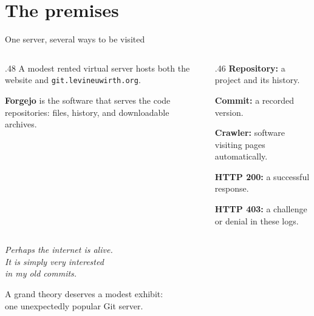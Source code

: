 \documentclass[aspectratio=169,11pt]{beamer}
\begin{document}
\section{The premises}
\begin{frame}{One server, several ways to be visited}
  \begin{columns}[T,onlytextwidth]
    \begin{column}{.48\textwidth}
      A modest rented virtual server hosts both the website and
      \texttt{git.levineuwirth.org}.\par\medskip
      \textbf{Forgejo} is the software that serves the code repositories:
      files, history, and downloadable archives.\par\medskip
    \end{column}
    \begin{column}{.46\textwidth}
      \textbf{Repository:} a project and its history.\par\smallskip
      \textbf{Commit:} a recorded version.\par\smallskip
      \textbf{Crawler:} software visiting pages automatically.\par\medskip
      \textbf{HTTP 200:} a successful response.\par\smallskip
      \textbf{HTTP 403:} a challenge or denial in these logs.
    \end{column}
  \end{columns}
\end{frame}

{\CQuiet
\begin{frame}[plain]
  \centering{}
  \bigskip
  {\fontsize{27}{31}\selectfont\itshape
    Perhaps the internet is alive.\\
    It is simply very interested\\in my old commits.\par}
  \bigskip\bigskip
  \begin{minipage}{110mm}\centering
    A grand theory deserves a modest exhibit:\\
    one unexpectedly popular Git server.
  \end{minipage}
\end{frame}}
\end{document}
